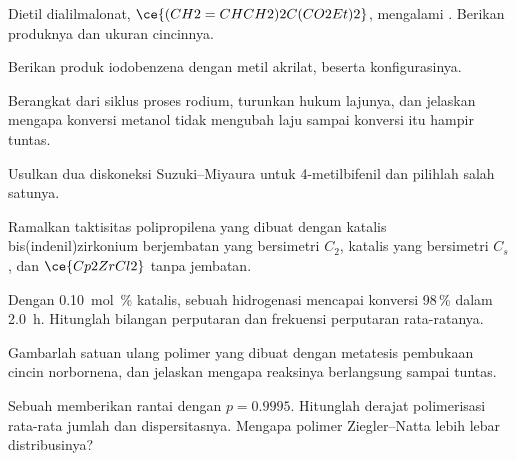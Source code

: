 \begin{exercise}[$\star$]\label{exo:b3:homogeneous-catalysis:3}
Dietil dialilmalonat, $\ce{(CH2=CHCH2)2C(CO2Et)2}$, mengalami .
Berikan produknya dan ukuran cincinnya.
\end{exercise}

\begin{exercise}[$\star$]\label{exo:b3:homogeneous-catalysis:4}
Berikan produk  iodobenzena dengan metil akrilat, beserta
konfigurasinya.
\end{exercise}

\begin{exercise}[$\star\star$]\label{exo:b3:homogeneous-catalysis:5}
Berangkat dari siklus proses rodium, turunkan hukum lajunya, dan jelaskan
mengapa konversi metanol tidak mengubah laju sampai konversi itu hampir tuntas.
\end{exercise}

\begin{exercise}[$\star\star$]\label{exo:b3:homogeneous-catalysis:6}
Usulkan dua diskoneksi Suzuki--Miyaura untuk 4-metilbifenil dan pilihlah salah satunya.
\end{exercise}

\begin{exercise}[$\star\star$]\label{exo:b3:homogeneous-catalysis:7}
Ramalkan taktisitas polipropilena yang dibuat dengan katalis bis(indenil)zirkonium berjembatan
yang bersimetri $C_2$, katalis yang bersimetri $C_s$, dan $\ce{Cp2ZrCl2}$ tanpa jembatan.
\end{exercise}

\begin{exercise}[$\star\star$]\label{exo:b3:homogeneous-catalysis:8}
Dengan \qty{0.10}{mol\%} katalis, sebuah hidrogenasi mencapai konversi 98\,\% dalam \qty{2.0}{h}.
Hitunglah bilangan perputaran dan frekuensi perputaran rata-ratanya.
\end{exercise}

\begin{exercise}[$\star\star$]\label{exo:b3:homogeneous-catalysis:9}
Gambarlah satuan ulang polimer yang dibuat dengan metatesis pembukaan cincin
norbornena, dan jelaskan mengapa reaksinya berlangsung sampai tuntas.
\end{exercise}

\begin{exercise}[$\star\star\star$]\label{exo:b3:homogeneous-catalysis:10}
Sebuah  memberikan rantai dengan $p = 0.9995$. Hitunglah derajat
polimerisasi rata-rata jumlah dan dispersitasnya. Mengapa polimer Ziegler--Natta
lebih lebar distribusinya?
\end{exercise}

